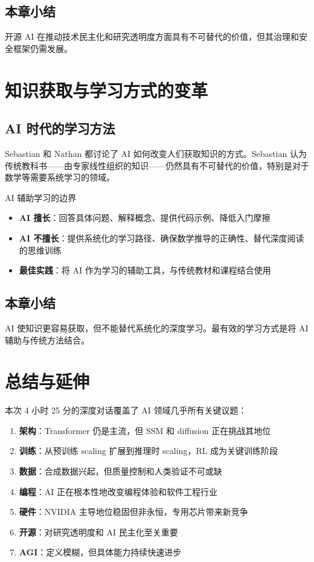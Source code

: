 \documentclass[a4paper]{article}
\begin{document}
\subsection{本章小结}

开源 AI 在推动技术民主化和研究透明度方面具有不可替代的价值，但其治理和安全框架仍需发展。

\section{知识获取与学习方式的变革}

\subsection{AI 时代的学习方法}

Sebastian 和 Nathan 都讨论了 AI 如何改变人们获取知识的方式。Sebastian 认为传统教科书——由专家线性组织的知识——仍然具有不可替代的价值，特别是对于数学等需要系统学习的领域。

\begin{knowledgebox}{AI 辅助学习的边界}
\begin{itemize}
    \item \textbf{AI 擅长}：回答具体问题、解释概念、提供代码示例、降低入门摩擦
    \item \textbf{AI 不擅长}：提供系统化的学习路径、确保数学推导的正确性、替代深度阅读的思维训练
    \item \textbf{最佳实践}：将 AI 作为学习的辅助工具，与传统教材和课程结合使用
\end{itemize}
\end{knowledgebox}

\subsection{本章小结}

AI 使知识更容易获取，但不能替代系统化的深度学习。最有效的学习方式是将 AI 辅助与传统方法结合。

\section{总结与延伸}

本次 4 小时 25 分的深度对话覆盖了 AI 领域几乎所有关键议题：

\begin{enumerate}
    \item \textbf{架构}：Transformer 仍是主流，但 SSM 和 diffusion 正在挑战其地位
    \item \textbf{训练}：从预训练 scaling 扩展到推理时 scaling，RL 成为关键训练阶段
    \item \textbf{数据}：合成数据兴起，但质量控制和人类验证不可或缺
    \item \textbf{编程}：AI 正在根本性地改变编程体验和软件工程行业
    \item \textbf{硬件}：NVIDIA 主导地位稳固但非永恒，专用芯片带来新竞争
    \item \textbf{开源}：对研究透明度和 AI 民主化至关重要
    \item \textbf{AGI}：定义模糊，但具体能力持续快速进步
\end{enumerate}
\end{document}
